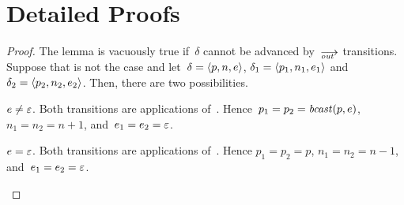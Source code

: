 \section{Detailed Proofs}
\label{sec.proofs}


\lemxdetout*
\begin{proof}
  The lemma is vacuously true if~$\delta$ cannot be advanced by~$\out$
  transitions.  Suppose that is not the case and let~$\delta=\<p,n,e>$,
  $\delta_1=\<p_1,n_1,e_1>$ and~$\delta_2=\<p_2,n_2,e_2>$.  Then, there are
  two possibilities.
  \begin{casex}
  \item $e\ne\varepsilon$.  Both transitions are applications of~.
    Hence~$p_1=p_2=\operatorname{\mathit{bcast}}(p,e)$, $n_1=n_2=n+1$, and~$e_1=e_2=\varepsilon$.
  \item $e=\varepsilon$.  Both transitions are applications of~.
    Hence $p_1=p_2=p$, $n_1=n_2=n-1$, and~$e_1=e_2=\varepsilon$.\qedhere
  \end{casex}
\end{proof}


